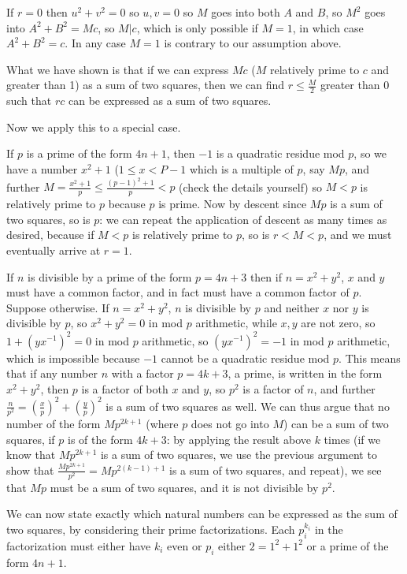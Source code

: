\documentclass[12pt]{article}
\begin{document}
If $r=0$ then $u^2+v^2=0$ so $u,v=0$ so $M$ goes into both $A$ and $B$,
so $M^2$ goes into $A^2+B^2=Mc$, so $M|c$, which is only possible if $M=1$, in which case $A^2+B^2=c$.  In any case $M=1$ is contrary to our assumption above.

What we have shown is that if we can express $Mc$ ($M$ relatively prime to $c$ and greater than 1) as a sum of two squares, then we
can find $r \leq \frac M2$ greater than 0 such that $rc$ can be expressed as a sum of two squares.

Now we apply this to a special case.

If $p$ is a prime of the form $4n+1$, then $-1$ is a quadratic residue mod $p$, so we have a number $x^2+1$ ($1 \leq x < P-1$ which is a multiple of $p$, say $Mp$, and further
$M=\frac{x^2+1}p \leq \frac{(p-1)^2+1}p<p$  (check the details yourself) so $M<p$ is relatively prime to $p$ because $p$ is prime.  Now by descent since $Mp$ is a sum of two squares, 
so is $p$:  we can repeat the application of descent as many times as desired, because if $M<p$ is relatively prime to $p$, so is $r<M<p$, and we must eventually arrive at $r=1$.

If $n$ is divisible by a prime of the form $p=4n+3$  then if $n=x^2+y^2$, $x$ and $y$ must have a common factor, and in fact must have a common factor of $p$.  Suppose otherwise.  If $n=x^2+y^2$, $n$ is divisible by $p$
and neither $x$ nor $y$ is divisible by $p$, so $x^2+y^2 = 0$ in mod $p$ arithmetic, while $x, y$ are not zero, so $1+(yx^{-1})^2=0$ in mod $p$ arithmetic, so
$(yx^{-1})^2=-1$ in mod $p$ arithmetic, which is impossible because $-1$ cannot be a quadratic residue mod $p$.    This means that if any number $n$ with a factor $p=4k+3$, a prime,
is written in the form $x^2+y^2$, then $p$ is a factor of both $x$ and $y$, so $p^2$ is a factor of $n$, and further $\frac{n}{p^2}=(\frac xp)^2 + (\frac yp)^2$ is a sum of two squares as well.  We can thus argue that no number of the form $Mp^{2k+1}$ (where $p$ does not go into $M$)  can be a sum of two squares, if $p$ is of the form $4k+3$: by applying the result above $k$ times (if we know that $Mp^{2k+1}$ is a sum of two squares, we use the previous argument to show that $\frac{Mp^{2k+1}}{p^2}=Mp^{2(k-1)+1}$ is a sum of two squares, and repeat), we see that $Mp$ must be a sum of two squares, and it is not divisible by $p^2$.

We can now state exactly which natural numbers can be expressed as the sum of two squares, by considering their prime factorizations.   Each $p_i^{k_i}$ in the factorization must either have
$k_i$ even or $p_i$ either $2 = 1^2+1^2$ or a prime of the form $4n+1$.
\end{document}
